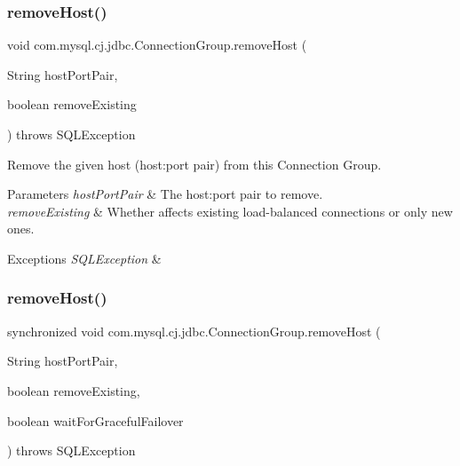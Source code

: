 \subsubsection{\texorpdfstring{remove\+Host()}{removeHost()}\hspace{0.1cm}{\footnotesize\ttfamily [2/3]}}
{\footnotesize\ttfamily void com.\+mysql.\+cj.\+jdbc.\+Connection\+Group.\+remove\+Host (\begin{DoxyParamCaption}\item[{String}]{host\+Port\+Pair,  }\item[{boolean}]{remove\+Existing }\end{DoxyParamCaption}) throws S\+Q\+L\+Exception}

Remove the given host (host\+:port pair) from this Connection Group.


\begin{DoxyParams}{Parameters}
{\em host\+Port\+Pair} & The host\+:port pair to remove. \\
\hline
{\em remove\+Existing} & Whether affects existing load-\/balanced connections or only new ones. \\
\hline
\end{DoxyParams}

\begin{DoxyExceptions}{Exceptions}
{\em S\+Q\+L\+Exception} & \\
\hline
\end{DoxyExceptions}
\mbox{\label{classcom_1_1mysql_1_1cj_1_1jdbc_1_1_connection_group_a2bfa53ec828966ecf49573250c11a4ca}} 
\subsubsection{\texorpdfstring{remove\+Host()}{removeHost()}\hspace{0.1cm}{\footnotesize\ttfamily [3/3]}}
{\footnotesize\ttfamily synchronized void com.\+mysql.\+cj.\+jdbc.\+Connection\+Group.\+remove\+Host (\begin{DoxyParamCaption}\item[{String}]{host\+Port\+Pair,  }\item[{boolean}]{remove\+Existing,  }\item[{boolean}]{wait\+For\+Graceful\+Failover }\end{DoxyParamCaption}) throws S\+Q\+L\+Exception}

